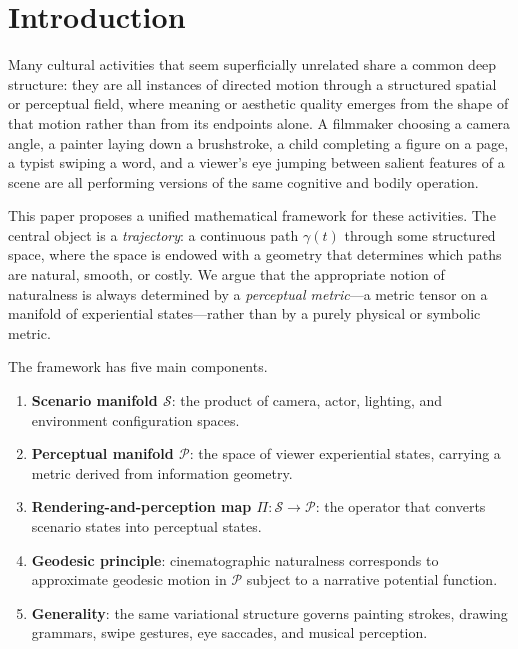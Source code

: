 \documentclass[12pt,a4paper]{article}
\theoremstyle{plain}
\theoremstyle{definition}
\begin{document}
\newpage
\setcounter{page}{1}
\tableofcontents
\newpage

\section{Introduction}

Many cultural activities that seem superficially unrelated share a common deep
structure: they are all instances of directed motion through a structured spatial
or perceptual field, where meaning or aesthetic quality emerges from the shape
of that motion rather than from its endpoints alone. A filmmaker choosing a
camera angle, a painter laying down a brushstroke, a child completing a figure
on a page, a typist swiping a word, and a viewer's eye jumping between salient
features of a scene are all performing versions of the same cognitive and bodily
operation.

This paper proposes a unified mathematical framework for these activities. The
central object is a \emph{trajectory}: a continuous path $\gamma(t)$ through some
structured space, where the space is endowed with a geometry that determines
which paths are natural, smooth, or costly. We argue that the appropriate notion
of naturalness is always determined by a \emph{perceptual metric}---a metric
tensor on a manifold of experiential states---rather than by a purely physical
or symbolic metric.

The framework has five main components.

\begin{enumerate}[label=(\arabic*)]
\item \textbf{Scenario manifold $\mathcal{S}$}: the product of camera, actor,
lighting, and environment configuration spaces.

\item \textbf{Perceptual manifold $\mathcal{P}$}: the space of viewer
experiential states, carrying a metric derived from information geometry.

\item \textbf{Rendering-and-perception map $\Pi:\mathcal{S}\to\mathcal{P}$}:
the operator that converts scenario states into perceptual states.

\item \textbf{Geodesic principle}: cinematographic naturalness corresponds to
approximate geodesic motion in $\mathcal{P}$ subject to a narrative potential
function.

\item \textbf{Generality}: the same variational structure governs painting
strokes, drawing grammars, swipe gestures, eye saccades, and musical
perception.
\end{enumerate}
\end{document}
